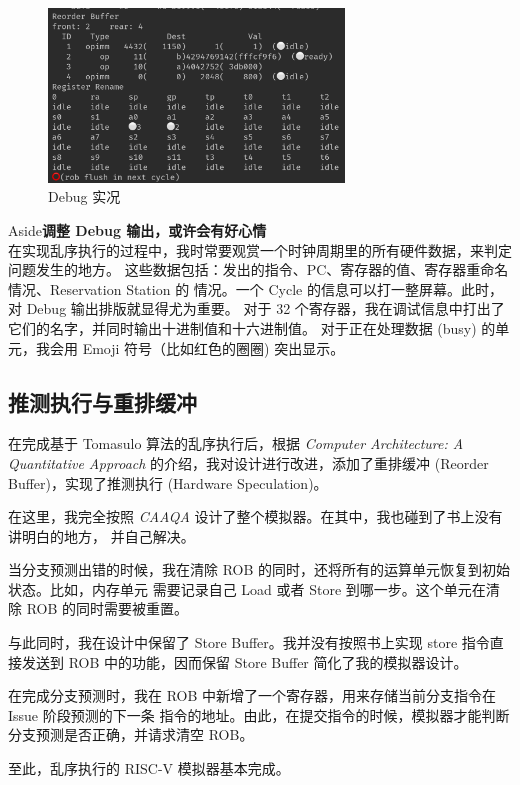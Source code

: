 \documentclass[12pt]{article}
\newenvironment{aside}[1]
    { \begin{tcolorbox}[enlarge top by=0.5cm, enlarge bottom by=0.5cm] Aside\space\space\space\space \textbf{#1} \\
        } { \end{tcolorbox} }
\begin{document}
    \begin{figure}[h]
        \centering
        \includegraphics[width=0.7\textwidth]{debug}
        \caption{Debug 实况}
    \end{figure}

    \begin{aside}{调整 Debug 输出，或许会有好心情}
        在实现乱序执行的过程中，我时常要观赏一个时钟周期里的所有硬件数据，来判定问题发生的地方。
        这些数据包括：发出的指令、PC、寄存器的值、寄存器重命名情况、Reservation Station 的
        情况。一个 Cycle 的信息可以打一整屏幕。此时，对 Debug 输出排版就显得尤为重要。
        对于 32 个寄存器，我在调试信息中打出了它们的名字，并同时输出十进制值和十六进制值。
        对于正在处理数据 (busy) 的单元，我会用 Emoji 符号（比如红色的圈圈) 突出显示。
    \end{aside}

    \subsection{推测执行与重排缓冲}\label{hardware-speculation}

    在完成基于 Tomasulo 算法的乱序执行后，根据 \emph{Computer Architecture: A Quantitative Approach}
    的介绍，我对设计进行改进，添加了重排缓冲 (Reorder Buffer)，实现了推测执行 
    (Hardware Speculation)。

    在这里，我完全按照 \emph{CAAQA} 设计了整个模拟器。在其中，我也碰到了书上没有讲明白的地方，
    并自己解决。

    当分支预测出错的时候，我在清除 ROB 的同时，还将所有的运算单元恢复到初始状态。比如，内存单元
    需要记录自己 Load 或者 Store 到哪一步。这个单元在清除 ROB 的同时需要被重置。

    与此同时，我在设计中保留了 Store Buffer。我并没有按照书上实现 store 指令直接发送到 ROB
    中的功能，因而保留 Store Buffer 简化了我的模拟器设计。

    在完成分支预测时，我在 ROB 中新增了一个寄存器，用来存储当前分支指令在 Issue 阶段预测的下一条
    指令的地址。由此，在提交指令的时候，模拟器才能判断分支预测是否正确，并请求清空 ROB。

    至此，乱序执行的 RISC-V 模拟器基本完成。
\end{document}
